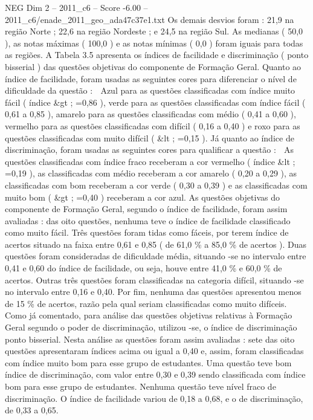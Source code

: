 \begin{textsample}{NEG Dim 2 – 2011\_c6 – Score -6.00 – 2011\_c6/enade\_2011\_geo\_ada47c37e1.txt}
Os demais desvios foram : 21,9 na região Norte ; 22,6 na região Nordeste ; e 24,5 na região Sul.
As medianas ( 50,0 ), as notas máximas ( 100,0 ) e as notas mínimas ( 0,0 ) foram iguais para todas as regiões.
A Tabela 3.5 apresenta os índices de facilidade e discriminação ( ponto bisserial ) das questões objetivas do componente de Formação Geral.
Quanto ao índice de facilidade, foram usadas as seguintes cores para diferenciar o nível de dificuldade da questão :  Azul para as questões classificadas com índice muito fácil ( índice \&gt ; =0,86 ), verde para as questões classificadas com índice fácil ( 0,61 a 0,85 ), amarelo para as questões classificadas com médio ( 0,41 a 0,60 ), vermelho para as questões classificadas com difícil ( 0,16 a 0,40 ) e roxo para as questões classificadas com muito difícil ( \&lt ; =0,15 ).
Já quanto ao índice de discriminação, foram usadas as seguintes cores para qualificar a questão :  As questões classificadas com índice fraco receberam a cor vermelho ( índice \&lt ; =0,19 ), as classificadas com médio receberam a cor amarelo ( 0,20 a 0,29 ), as classificadas com bom receberam a cor verde ( 0,30 a 0,39 ) e as classificadas com muito bom ( \&gt ; =0,40 ) receberam a cor azul.
As questões objetivas do componente de Formação Geral, segundo o índice de facilidade, foram assim avaliadas : das oito questões, nenhuma teve o índice de facilidade classificado como muito fácil.
Três questões foram tidas como fáceis, por terem índice de acertos situado na faixa entre 0,61 e 0,85 ( de 61,0 \% a 85,0 \% de acertos ).
Duas questões foram consideradas de dificuldade média, situando -se no intervalo entre 0,41 e 0,60 do índice de facilidade, ou seja, houve entre 41,0 \% e 60,0 \% de acertos.
Outras três questões foram classificadas na categoria difícil, situando -se no intervalo entre 0,16 e 0,40.
Por fim, nenhuma das questões apresentou menos de 15 \% de acertos, razão pela qual seriam classificadas como muito difíceis.
Como já comentado, para análise das questões objetivas relativas à Formação Geral segundo o poder de discriminação, utilizou -se, o índice de discriminação ponto bisserial.
Nesta análise as questões foram assim avaliadas : sete das oito questões apresentaram índices acima ou igual a 0,40 e, assim, foram classificadas com índice muito bom para esse grupo de estudantes.
Uma questão teve bom índice de discriminação, com valor entre 0,30 e 0,39 sendo classificada com índice bom para esse grupo de estudantes.
Nenhuma questão teve nível fraco de discriminação.
O índice de facilidade variou de 0,18 a 0,68, e o de discriminação, de 0,33 a 0,65.

\end{textsample}
